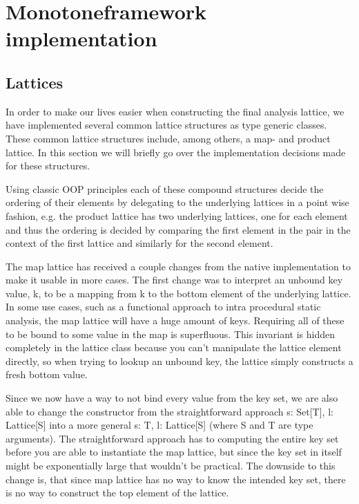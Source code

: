 \chapter{Monotoneframework implementation}

\section{Lattices}

In order to make our lives easier when constructing the final analysis lattice, we have implemented several common lattice structures as type generic classes. These common lattice structures include, among others, a map- and product lattice. In this section we will briefly go over the implementation decisions made for these structures.

Using classic OOP principles each of these compound structures decide the ordering of their elements by delegating to the underlying lattices in a point wise fashion, e.g. the product lattice has two underlying lattices, one for each element and thus the ordering is decided by comparing the first element in the pair in the context of the first lattice and similarly for the second element.

The map lattice has received a couple changes from the native implementation to make it usable in more cases. The first change was to interpret an unbound key value, k, to be a mapping from k to the bottom element of the underlying lattice. In some use cases, such as a functional approach to intra procedural static analysis, the map lattice will have a huge amount of keys. Requiring all of these to be bound to some value in the map is superfluous. This invariant is hidden completely in the lattice class because you can't manipulate the lattice element directly, so when trying to lookup an unbound key, the lattice simply constructs a fresh bottom value.

Since we now have a way to not bind every value from the key set, we are also able to change the constructor from the straightforward approach s: Set[T], l: Lattice[S] into a more general s: T, l: Lattice[S] (where S and T are type arguments). The straightforward approach has to computing the entire key set before you are able to instantiate the map lattice, but since the key set in itself might be exponentially large that wouldn't be practical. The downside to this change is, that since map lattice has no way to know the intended key set, there is no way to construct the top element of the lattice.

